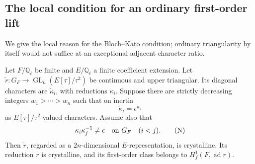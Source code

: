 \subsection{The local condition for an ordinary first-order lift}
\label{sec:sr-rank-four-local-tangent}

We give the local reason for the Bloch--Kato condition; ordinary
triangularity by itself would not suffice at an exceptional adjacent
character ratio.

\begin{srlemma}\label{lem:sr-positive-ordinary-extension}
Let \(F/\mathbb Q_\ell\) be finite and \(E/\mathbb Q_\ell\) a finite
coefficient extension. Let
\(\widetilde r:G_F\to\operatorname{GL}_n(E[\tau]/\tau^2)\)
be continuous and upper triangular.
Its diagonal characters are \(\widetilde\kappa_i\), with reductions
\(\kappa_i\).
Suppose there are strictly decreasing integers
\(w_1>\cdots>w_n\) such that on inertia
\[
                \widetilde\kappa_i=\epsilon^{w_i}
\]
as \(E[\tau]/\tau^2\)-valued characters.
Assume also that
\[
               \kappa_i\kappa_j^{-1}\ne\epsilon
                  \quad\hbox{on }G_F\quad (i<j).
 \tag{N}
\]
Then \(\widetilde r\), regarded as a \(2n\)-dimensional
\(E\)-representation, is crystalline.
Its reduction \(r\) is crystalline, and its first-order class
belongs to \(H^1_f(F,\operatorname{ad}r)\).
\end{srlemma}
